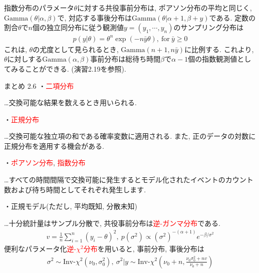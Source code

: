 \documentclass[10pt,dvipdfmx,a4]{beamer}
\newcommand{\eqn}[1]{\begin{align*}#1\end{align*}}
\newcommand{\tcr}[1]{\textcolor{red}{#1}}
\begin{document}

\begin{frame}
指数分布のパラメータ$\theta$に対する共役事前分布は, ポアソン分布の平均と同じく, $\text{Gamma}(\theta|\alpha,\beta)$で, 対応する事後分布は$\text{Gamma}(\theta|\alpha+1,\beta+y)$である.
定数の割合$\theta$で$n$個の独立同分布に従う観測値$y=(y_1,\cdots,y_n)$のサンプリング分布は
\eqn{p(y|\theta)=\theta^n\exp(-n\bar{y}\theta),\ \text{for}\ \bar{y}\geq 0}
これは, $\theta$の尤度として見られるとき, $\text{Gamma}(n+1,n\bar{y})$に比例する.
これより, $\theta$に対しする$\text{Gamma}(\alpha,\beta)$事前分布は総待ち時間$\beta$で$\alpha-1$個の指数観測値としてみることができる.
(演習2.19を参照).
\end{frame}


\begin{frame}{まとめ 2.6}
・\tcr{二項分布}

…交換可能な結果を数えるとき用いられる.

・\tcr{正規分布}

…交換可能な独立項の和である確率変数に適用される.
また, 正のデータの対数に正規分布を適用する機会がある.

・\tcr{ポアソン分布}, \tcr{指数分布}

…すべての時間間隔で交換可能に発生するとモデル化されたイベントのカウント数および待ち時間としてそれぞれ発生します.

・正規モデル(ただし, 平均既知, 分散未知)

…十分統計量はサンプル分散で, 共役事前分布は\tcr{逆-ガンマ分布}である.
\eqn{v=\frac{1}{n}\sum_{i=1}^n(y_i-\theta)^2,\ p(\sigma^2)\propto (\sigma^2)^{-(\alpha+1)}e^{-\beta/\sigma^2}}
便利なパラメータ化\tcr{逆-$\chi^2$分布}を用いると, 事前分布, 事後分布は
\eqn{\sigma^2\sim \text{Inv-}\chi^2(\nu_0,\sigma_0^2),\ \sigma^2|y\sim \text{Inv-}\chi^2\left(\nu_0+n,\tfrac{\nu_0\sigma_0^2+nv}{\nu_0+n}\right)}
\end{frame}

\end{document}
